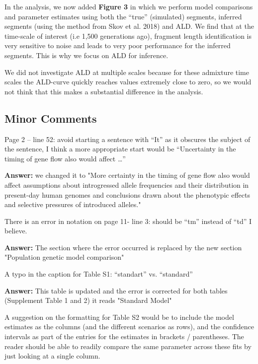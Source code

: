 \documentclass[11pt]{article}
\begin{document}
In the analysis, we now added \textbf{Figure 3} in which we perform model comparisons and parameter estimates using both the ``true'' (simulated) segments, inferred segments (using the method from Skov et al. 2018) and ALD. We find that at the time-scale of interest (i.e 1,500 generations ago), fragment length identification is very sensitive to noise and leads to very poor performance for the inferred segments. This is why we focus on ALD for inference. 

We did not investigate ALD at multiple scales because for these admixture time scales the ALD-curve quickly reaches values extremely close to zero, so we would not think that this makes a substantial difference in the analysis. 



\subsection{Minor Comments}\label{Minor Comments}

Page 2 – line 52: avoid starting a sentence with “It” as it obscures the subject of the sentence, I think a more appropriate start would be “Uncertainty in the timing of gene flow also would affect …”

\textbf{Answer:} we changed it to "More certainty in the timing of gene flow also would affect  assumptions about introgressed allele frequencies and their distribution in present-day human genomes and conclusions drawn about the phenotypic effects and selective pressures of introduced alleles."

There is an error in notation on page 11- line 3: should be “tm” instead of “td” I believe.

\textbf{Answer:} The section where the error occurred is replaced by the new section "Population genetic model comparison"

A typo in the caption for Table S1: “standart” vs. “standard”

\textbf{Answer:} This table is updated and the error is corrected for both tables (Supplement Table 1 and 2) it reads "Standard Model"

A suggestion on the formatting for Table S2 would be to include the model estimates as the columns (and the different scenarios as rows), and the confidence intervals as part of the entries for the estimates in brackets / parentheses. The reader should be able to readily compare the same parameter across these fits by just looking at a single column. 
\end{document}
